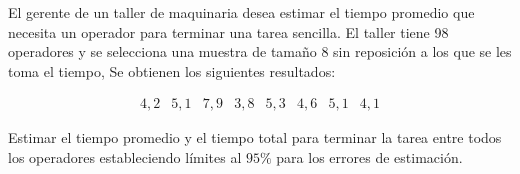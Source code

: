 

\question El gerente de un taller de maquinaria desea estimar el tiempo promedio que necesita un operador para terminar una tarea sencilla. El taller tiene 98 operadores y se selecciona una muestra de tamaño 8 sin reposición a los que se les toma el tiempo, Se obtienen los siguientes resultados:

$$
\begin{array}{llllllll}
4,2 & 5,1 & 7,9 & 3,8 & 5,3 & 4,6 & 5,1 & 4,1
\end{array}
$$

Estimar el tiempo promedio y el tiempo total para terminar la tarea entre todos los operadores estableciendo límites al $95 \%$ para los errores de estimación.